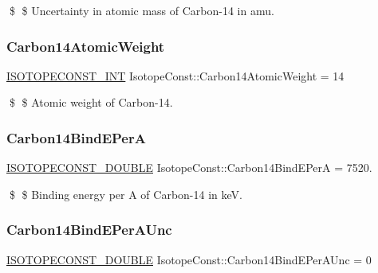 \$ \$ Uncertainty in atomic mass of Carbon-\/14 in amu. \mbox{\label{group___isotope_const-_carbon-_c14_ga43cebc563dcf6e3277e051b9c78b7fba}} 
\subsubsection{\texorpdfstring{Carbon14\+Atomic\+Weight}{Carbon14AtomicWeight}}
{\footnotesize\ttfamily \mbox{\hyperlink{group___isotope_const-_macros_ga5f18360b3e99483a35c32d789e62621c}{I\+S\+O\+T\+O\+P\+E\+C\+O\+N\+S\+T\+\_\+\+I\+NT}} Isotope\+Const\+::\+Carbon14\+Atomic\+Weight = 14}

\$ \$ Atomic weight of Carbon-\/14. \mbox{\label{group___isotope_const-_carbon-_c14_ga304f2e8dbe0fe4304e99a1efd5a7b66b}} 
\subsubsection{\texorpdfstring{Carbon14\+Bind\+E\+PerA}{Carbon14BindEPerA}}
{\footnotesize\ttfamily \mbox{\hyperlink{group___isotope_const-_macros_ga8f45a7272ce02c0b4c65c44636ed719a}{I\+S\+O\+T\+O\+P\+E\+C\+O\+N\+S\+T\+\_\+\+D\+O\+U\+B\+LE}} Isotope\+Const\+::\+Carbon14\+Bind\+E\+PerA = 7520.}

\$ \$ Binding energy per A of Carbon-\/14 in keV. \mbox{\label{group___isotope_const-_carbon-_c14_ga136d41211dbfe6e7ebc64fb72d388819}} 
\subsubsection{\texorpdfstring{Carbon14\+Bind\+E\+Per\+A\+Unc}{Carbon14BindEPerAUnc}}
{\footnotesize\ttfamily \mbox{\hyperlink{group___isotope_const-_macros_ga8f45a7272ce02c0b4c65c44636ed719a}{I\+S\+O\+T\+O\+P\+E\+C\+O\+N\+S\+T\+\_\+\+D\+O\+U\+B\+LE}} Isotope\+Const\+::\+Carbon14\+Bind\+E\+Per\+A\+Unc = 0}

